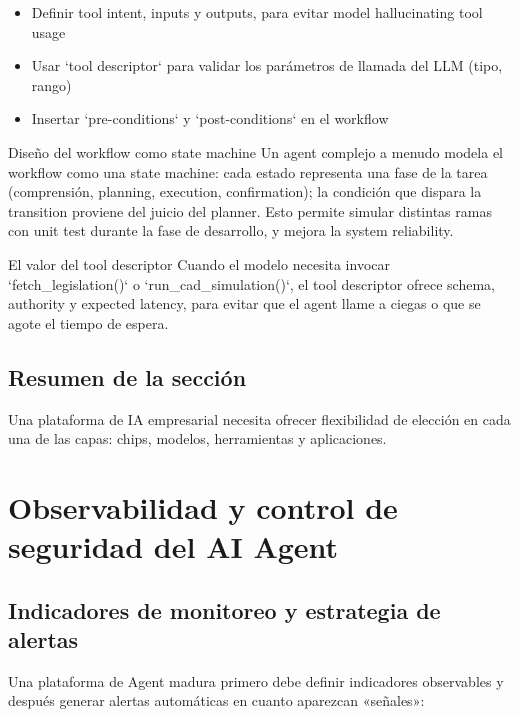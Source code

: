\documentclass[a4paper]{article}
\begin{document}
\begin{itemize}
    \item Definir tool intent, inputs y outputs, para evitar model hallucinating tool usage
    \item Usar `tool descriptor` para validar los parámetros de llamada del LLM (tipo, rango)
    \item Insertar `pre-conditions` y `post-conditions` en el workflow
\end{itemize}

\begin{knowledgebox}{Diseño del workflow como state machine}
Un agent complejo a menudo modela el workflow como una state machine: cada estado representa una fase de la tarea (comprensión, planning, execution, confirmation); la condición que dispara la transition proviene del juicio del planner. Esto permite simular distintas ramas con unit test durante la fase de desarrollo, y mejora la system reliability.
\end{knowledgebox}
\begin{knowledgebox}{El valor del tool descriptor}
Cuando el modelo necesita invocar `fetch\_legislation()` o `run\_cad\_simulation()`, el tool descriptor ofrece schema, authority y expected latency, para evitar que el agent llame a ciegas o que se agote el tiempo de espera.
\end{knowledgebox}

\subsection{Resumen de la sección}

Una plataforma de IA empresarial necesita ofrecer flexibilidad de elección en cada una de las capas: chips, modelos, herramientas y aplicaciones.

\section{Observabilidad y control de seguridad del AI Agent}

\subsection{Indicadores de monitoreo y estrategia de alertas}

Una plataforma de Agent madura primero debe definir indicadores observables y después generar alertas automáticas en cuanto aparezcan «señales»:
\end{document}
